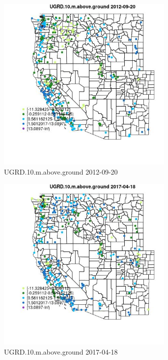 \begin{figure} 
\centering  
\includegraphics[width=0.77\textwidth]{Code_Outputs/Report_ML_input_PM25_Step4_part_e_de_duplicated_aves_compiled_2019-05-14wNAs_MapObsUGRD10maboveground2012-09-20.jpg} 
\caption{\label{fig:Report_ML_input_PM25_Step4_part_e_de_duplicated_aves_compiled_2019-05-14wNAsMapObsUGRD10maboveground2012-09-20}UGRD.10.m.above.ground 2012-09-20} 
\end{figure} 
 

\begin{figure} 
\centering  
\includegraphics[width=0.77\textwidth]{Code_Outputs/Report_ML_input_PM25_Step4_part_e_de_duplicated_aves_compiled_2019-05-14wNAs_MapObsUGRD10maboveground2017-04-18.jpg} 
\caption{\label{fig:Report_ML_input_PM25_Step4_part_e_de_duplicated_aves_compiled_2019-05-14wNAsMapObsUGRD10maboveground2017-04-18}UGRD.10.m.above.ground 2017-04-18} 
\end{figure} 
 

